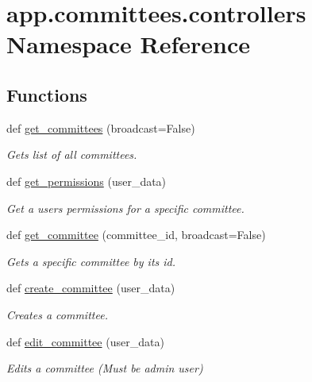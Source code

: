 \hypertarget{namespaceapp_1_1committees_1_1controllers}{}\section{app.\+committees.\+controllers Namespace Reference}
\label{namespaceapp_1_1committees_1_1controllers}
\subsection*{Functions}
\begin{DoxyCompactItemize}
\item 
def \mbox{\hyperlink{namespaceapp_1_1committees_1_1controllers_a13062ac4ed1e797b5015282df19f6171}{get\+\_\+committees}} (broadcast=False)
\begin{DoxyCompactList}\small\item\em Gets list of all committees. \end{DoxyCompactList}\item 
def \mbox{\hyperlink{namespaceapp_1_1committees_1_1controllers_a3583100187139ebf105b562438e9bf7a}{get\+\_\+permissions}} (user\+\_\+data)
\begin{DoxyCompactList}\small\item\em Get a users permissions for a specific committee. \end{DoxyCompactList}\item 
def \mbox{\hyperlink{namespaceapp_1_1committees_1_1controllers_a85c678c4dc91cc884de63f2a7d8b3b52}{get\+\_\+committee}} (committee\+\_\+id, broadcast=False)
\begin{DoxyCompactList}\small\item\em Gets a specific committee by its id. \end{DoxyCompactList}\item 
def \mbox{\hyperlink{namespaceapp_1_1committees_1_1controllers_a43d988c96e26843d6b0fa328bfbfca5e}{create\+\_\+committee}} (user\+\_\+data)
\begin{DoxyCompactList}\small\item\em Creates a committee. \end{DoxyCompactList}\item 
def \mbox{\hyperlink{namespaceapp_1_1committees_1_1controllers_a1be50a5e100f6e73441b49cda5fef1e0}{edit\+\_\+committee}} (user\+\_\+data)
\begin{DoxyCompactList}\small\item\em Edits a committee (Must be admin user) \end{DoxyCompactList}\end{DoxyCompactItemize}


